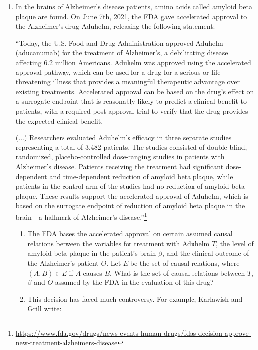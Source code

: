 \begin{enumerate}
    \begin{ungradedsolution}
        Many correct answers exist.
    \end{ungradedsolution}


    \item %
    In the brains of Alzheimer's disease patients, amino acids called amyloid beta plaque are found. On June 7th, 2021, the FDA gave accelerated approval to the Alzheimer's drug Aduhelm, releasing the following statement:

    ``Today, the U.S. Food and Drug Administration approved Aduhelm (aducanumab) for the treatment of Alzheimer's, a debilitating disease affecting 6.2 million Americans. Aduhelm was approved using the accelerated approval pathway, which can be used for a drug for a serious or life-threatening illness that provides a meaningful therapeutic advantage over existing treatments. Accelerated approval can be based on the drug's effect on a surrogate endpoint that is reasonably likely to predict a clinical benefit to patients, with a required post-approval trial to verify that the drug provides the expected clinical benefit.

    (...) Researchers evaluated Aduhelm's efficacy in three separate studies representing a total of 3,482 patients. The studies consisted of double-blind, randomized, placebo-controlled dose-ranging studies in patients with Alzheimer's disease. Patients receiving the treatment had significant dose-dependent and time-dependent reduction of amyloid beta plaque, while patients in the control arm of the studies had no reduction of amyloid beta plaque. These results support the accelerated approval of Aduhelm, which is based on the surrogate endpoint of reduction of amyloid beta plaque in the brain---a hallmark of Alzheimer's disease.''\footnote{\url{https://www.fda.gov/drugs/news-events-human-drugs/fdas-decision-approve-new-treatment-alzheimers-disease}}
    \begin{enumerate}
        \item The FDA bases the accelerated approval on certain assumed causal relations between the variables for treatment with Aduhelm $T$, the level of amyloid beta plaque in the patient's brain $\beta$, and the clinical outcome of the Alzheimer's patient $O$. Let $E$ be the set of causal relations, where $(A,B) \in E$ if $A$ causes $B$. What is the set of causal relations between $T$, $\beta$ and $O$ assumed by the FDA in the evaluation of this drug?
        \item This decision has faced much controversy. For example, Karlawish and Grill write:


\end{enumerate}
\end{enumerate}
